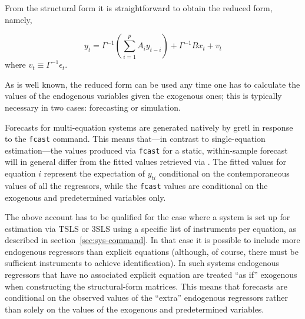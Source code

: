 From the structural form it is straightforward to obtain the reduced
form, namely,

\begin{equation}
  \label{eq:VAR-reduced-form}
  y_t = \Gamma^{-1} \left(\sum_{i=1}^p A_i y_{t-i}\right)
  + \Gamma^{-1} B x_t + v_t
\end{equation}
where $v_t \equiv \Gamma^{-1}\epsilon_t$.

As is well known, the reduced form can be used any time one has to
calculate the values of the endogenous variables given the exogenous
ones; this is typically necessary in two cases: forecasting or simulation.

Forecasts for multi-equation systems are generated natively by gretl
in response to the \texttt{fcast} command. This means that---in
contrast to single-equation estimation---the values produced via
\texttt{fcast} for a static, within-sample forecast will in general
differ from the fitted values retrieved via
. The fitted values for equation
$i$ represent the expectation of $y_{ti}$ conditional on the
contemporaneous values of all the regressors, while the \texttt{fcast}
values are conditional on the exogenous and predetermined variables
only.

The above account has to be qualified for the case where a system is
set up for estimation via TSLS or 3SLS using a specific list of
instruments per equation, as described in
section~\ref{sec:sys-command}. In that case it is possible to include
more endogenous regressors than explicit equations (although, of
course, there must be sufficient instruments to achieve
identification). In such systems endogenous regressors that have no
associated explicit equation are treated ``as if'' exogenous when
constructing the structural-form matrices. This means that forecasts
are conditional on the observed values of the ``extra'' endogenous
regressors rather than solely on the values of the exogenous and
predetermined variables.

